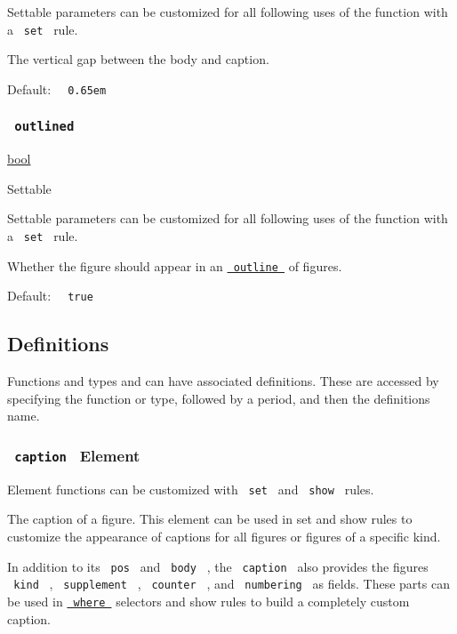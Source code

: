 \label{parameters-gap-settable-tooltip}
Settable parameters can be customized for all following uses of the
function with a \texttt{\ set\ } rule.

The vertical gap between the body and caption.

Default: \texttt{\ }{\texttt{\ 0.65em\ }}\texttt{\ }

\subsubsection{\texorpdfstring{\texttt{\ outlined\ }}{ outlined }}\label{parameters-outlined}

\href{/docs/reference/foundations/bool/}{bool}

{{ Settable }}

\label{parameters-outlined-settable-tooltip}
Settable parameters can be customized for all following uses of the
function with a \texttt{\ set\ } rule.

Whether the figure should appear in an
\href{/docs/reference/model/outline/}{\texttt{\ outline\ }} of figures.

Default: \texttt{\ }{\texttt{\ true\ }}\texttt{\ }

\subsection{\texorpdfstring{{ Definitions
}}{ Definitions }}\label{definitions}

\label{definitions-tooltip}
Functions and types and can have associated definitions. These are
accessed by specifying the function or type, followed by a period, and
then the definition\textquotesingle s name.

\subsubsection{\texorpdfstring{\texttt{\ caption\ } {{ Element
}}}{ caption   Element }}\label{definitions-caption}

\label{definitions-caption-element-tooltip}
Element functions can be customized with \texttt{\ set\ } and
\texttt{\ show\ } rules.

The caption of a figure. This element can be used in set and show rules
to customize the appearance of captions for all figures or figures of a
specific kind.

In addition to its \texttt{\ pos\ } and \texttt{\ body\ } , the
\texttt{\ caption\ } also provides the figure\textquotesingle s
\texttt{\ kind\ } , \texttt{\ supplement\ } , \texttt{\ counter\ } , and
\texttt{\ numbering\ } as fields. These parts can be used in
\href{/docs/reference/foundations/function/\#definitions-where}{\texttt{\ where\ }}
selectors and show rules to build a completely custom caption.

